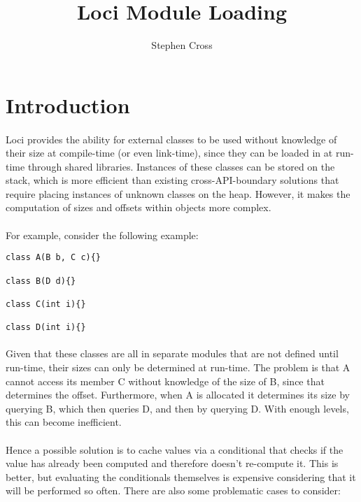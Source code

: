 \documentclass{article}
\title{Loci Module Loading}
\author{Stephen Cross}
\date{}
\begin{document}
\maketitle

\section{Introduction}

\paragraph{}
Loci provides the ability for external classes to be used without knowledge of their size at compile-time (or even link-time), since they can be loaded in at run-time through shared libraries. Instances of these classes can be stored on the stack, which is more efficient than existing cross-API-boundary solutions that require placing instances of unknown classes on the heap. However, it makes the computation of sizes and offsets within objects more complex.

\paragraph{}
For example, consider the following example:

\begin{verbatim}
class A(B b, C c){}

class B(D d){}

class C(int i){}

class D(int i){}
\end{verbatim}

\paragraph{}
Given that these classes are all in separate modules that are not defined until run-time, their sizes can only be determined at run-time. The problem is that A cannot access its member C without knowledge of the size of B, since that determines the offset. Furthermore, when A is allocated it determines its size by querying B, which then queries D, and then by querying D. With enough levels, this can become inefficient.

\paragraph{}
Hence a possible solution is to cache values via a conditional that checks if the value has already been computed and therefore doesn't re-compute it. This is better, but evaluating the conditionals themselves is expensive considering that it will be performed so often. There are also some problematic cases to consider:
\end{document}
